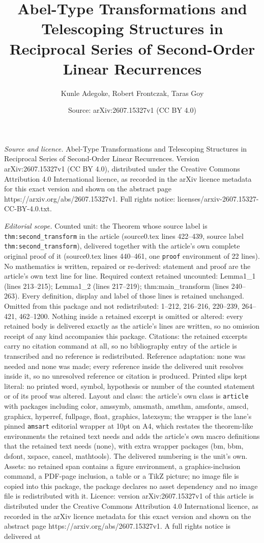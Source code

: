 \documentclass[10pt,a4paper]{amsart}
\title[Abel-Type Transformations and Telescoping Structures in Reci]{Abel-Type Transformations and Telescoping Structures in Reciprocal Series of Second-Order Linear Recurrences}
\author{Kunle Adegoke, Robert Frontczak, Taras Goy}
\date{Source: arXiv:2607.15327v1 (CC BY 4.0)}
\begin{document}
\maketitle

\noindent\emph{Source and licence.} Abel-Type Transformations and Telescoping Structures in Reciprocal Series of Second-Order Linear Recurrences. Version arXiv:2607.15327v1 (CC BY 4.0), distributed under the Creative Commons Attribution 4.0 International licence, as recorded in the arXiv licence metadata for this exact version and shown on the abstract page https://arxiv.org/abs/2607.15327v1. Full rights notice: licenses/arxiv-2607.15327-CC-BY-4.0.txt.\par\smallskip

\noindent\textit{Editorial scope.} Counted unit: the Theorem whose source label is \texttt{thm:second\_transform} in the article (source0.tex lines 422--439, source label \texttt{thm:second\_transform}), delivered together with the article's own complete original proof of it (source0.tex lines 440--461, one \texttt{proof} environment of 22 lines). No mathematics is written, repaired or re-derived: statement and proof are the article's own text line for line. Required context retained uncounted: Lemma1\_1 (lines 213--215); Lemma1\_2 (lines 217--219); thm:main\_transform (lines 240--263). Every definition, display and label of those lines is retained unchanged. Omitted from this package and not redistributed: 1--212, 216--216, 220--239, 264--421, 462--1200. Nothing inside a retained excerpt is omitted or altered: every retained body is delivered exactly as the article's lines are written, so no omission receipt of any kind accompanies this package. Citations: the retained excerpts carry no citation command at all, so no bibliography entry of the article is transcribed and no reference is redistributed. Reference adaptation: none was needed and none was made; every reference inside the delivered unit resolves inside it, so no unresolved reference or citation is produced. Printed slips kept literal: no printed word, symbol, hypothesis or number of the counted statement or of its proof was altered. Layout and class: the article's own class is \texttt{article} with packages including color, amssymb, amsmath, amsthm, amsfonts, amscd, graphicx, hyperref, fullpage, float, graphics, latexsym; the wrapper is the lane's pinned \texttt{amsart} editorial wrapper at 10pt on A4, which restates the theorem-like environments the retained text needs and adds the article's own macro definitions that the retained text needs (none), with extra wrapper packages (bm, bbm, dsfont, xspace, cancel, mathtools). The delivered numbering is the unit's own. Assets: no retained span contains a figure environment, a graphics-inclusion command, a PDF-page inclusion, a table or a TikZ picture; no image file is copied into this package, the package declares no asset dependency and no image file is redistributed with it. Licence: version arXiv:2607.15327v1 of this article is distributed under the Creative Commons Attribution 4.0 International licence, as recorded in the arXiv licence metadata for this exact version and shown on the abstract page https://arxiv.org/abs/2607.15327v1. A full rights notice is delivered at 
\end{document}
